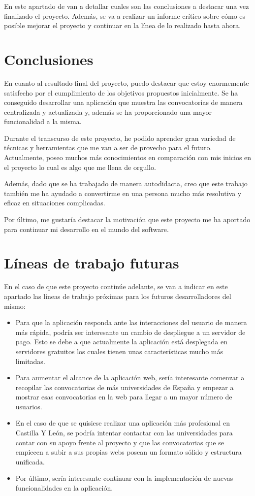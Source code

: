 
En este apartado de van a detallar cuales son las conclusiones a destacar una vez finalizado el proyecto. Además, se va a realizar un informe crítico sobre cómo es posible mejorar el proyecto y continuar en la línea de lo realizado hasta ahora.

\section{Conclusiones}
En cuanto al resultado final del proyecto, puedo destacar que estoy enormemente satisfecho por el cumplimiento de los objetivos propuestos inicialmente. Se ha conseguido desarrollar una aplicación que muestra las convocatorias de manera centralizada y actualizada y, además se ha proporcionado una mayor funcionalidad a la misma.

Durante el transcurso de este proyecto, he podido aprender gran variedad de técnicas y herramientas que me van a ser de provecho para el futuro. Actualmente, poseo muchos más conocimientos en comparación con mis inicios en el proyecto lo cual es algo que me llena de orgullo.

Además, dado que se ha trabajado de manera autodidacta, creo que este trabajo también me ha ayudado a convertirme en una persona mucho más resolutiva y eficaz en situaciones complicadas.

Por último, me gustaría destacar la motivación que este proyecto me ha aportado para continuar mi desarrollo en el mundo del software.


\section{Líneas de trabajo futuras}
En el caso de que este proyecto continúe adelante, se van a indicar en este apartado las líneas de trabajo próximas para los futuros desarrolladores del mismo:

\begin{itemize}
    \item Para que la aplicación responda ante las interacciones del usuario de manera más rápida, podría ser interesante un cambio de despliegue a un servidor de pago. Esto se debe a que actualmente la aplicación está desplegada en servidores gratuitos los cuales tienen unas características mucho más limitadas.
    \item Para aumentar el alcance de la aplicación web, sería interesante comenzar a recopilar las convocatorias de más universidades de España y empezar a mostrar esas convocatorias en la web para llegar a un mayor número de usuarios.
    \item En el caso de que se quisiese realizar una aplicación más profesional en Castilla Y León, se podría intentar contactar con las universidades para contar con su apoyo frente al proyecto y que las convocatorias que se empiecen a subir a sus propias webs posean un formato sólido y estructura unificada.
    \item Por último, sería interesante continuar con la implementación de nuevas funcionalidades en la aplicación.
\end{itemize}